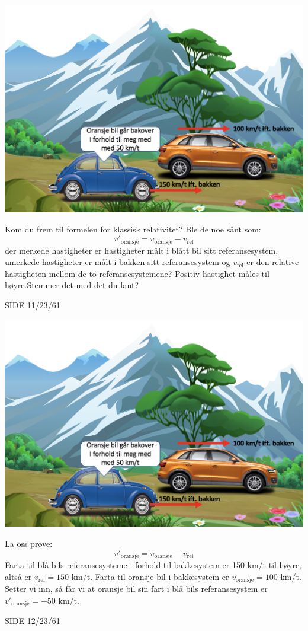 \documentclass{beamer}
\begin{document}
\begin{frame}
{
\centerline{\includegraphics[scale=0.3]{media/klassrel7.png}}
{\small
Kom du frem til formelen for klassisk relativitet? Ble de noe sånt som:
\[
v'_\mathrm{oransje}=v_\mathrm{oransje}-v_\mathrm{rel}
\]
der merkede hastigheter er hastigheter målt i blått bil sitt referansesystem, umerkede hastigheter er målt i bakken sitt referansesystem og $v_\mathrm{rel}$ er den relative hastigheten mellom de to referansesystemene? Positiv hastighet måles til høyre.Stemmer det med det du fant?
}
}{SIDE 11/23/61}

{
\centerline{\includegraphics[scale=0.3]{media/klassrel7.png}}
{\small
La oss prøve:
\[
v'_\mathrm{oransje}=v_\mathrm{oransje}-v_\mathrm{rel}
\]
Farta til blå bils referansesysteme i forhold til bakkesystem er 150 km/t til høyre, altså er $v_\mathrm{rel}=150$ km/t. Farta til oransje bil i bakkesystem er $v_\mathrm{oransje}=100$ km/t. Setter vi inn, så får vi at oransje bil sin fart i blå bils referansesystem er  $v'_\mathrm{oransje}=-50$ km/t.
}
}{SIDE 12/23/61}



\end{frame}
\end{document}
